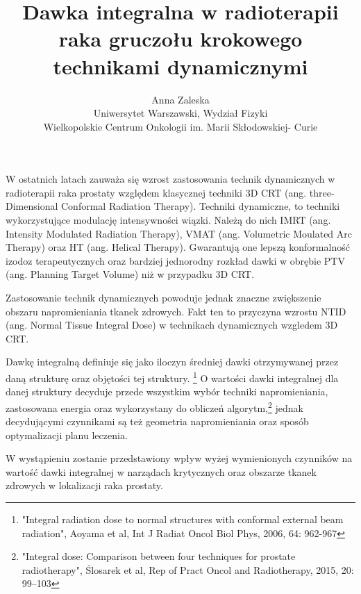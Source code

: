 \documentclass[12pt, a4paper]{article}
\begin{document}
\title{Dawka integralna w radioterapii raka gruczołu krokowego technikami dynamicznymi}
\author{Anna Zaleska \\ Uniwersytet Warszawski, Wydział Fizyki\\ Wielkopolskie Centrum Onkologii im. Marii Skłodowskiej- Curie}
\date {}
\maketitle
\thispagestyle{title}

W ostatnich latach zauważa się wzrost zastosowania technik dynamicznych w radioterapii raka prostaty względem klasycznej techniki 3D CRT (ang. three-Dimensional Conformal Radiation Therapy). Techniki dynamiczne, to techniki wykorzystujące modulację intensywności wiązki. Należą do nich IMRT (ang. Intensity Modulated Radiation Therapy), VMAT (ang. Volumetric Moulated Arc Therapy) oraz HT (ang. Helical Therapy). Gwarantują one lepszą konformalność izodoz terapeutycznych oraz bardziej jednorodny rozkład dawki w obrębie PTV (ang. Planning Target Volume) niż w przypadku 3D CRT.

Zastosowanie technik dynamicznych powoduje jednak znaczne zwiększenie obszaru napromieniania tkanek zdrowych. Fakt ten to przyczyna wzrostu NTID (ang. Normal Tissue Integral Dose) w technikach dynamicznych wzgledem 3D CRT. 

Dawkę integralną definiuje się jako iloczyn średniej dawki otrzymywanej przez daną strukturę oraz objętości tej struktury. \footnote{"Integral radiation dose to normal structures with conformal external beam radiation", Aoyama et al, Int J Radiat Oncol Biol Phys, 2006, 64: 962-967} O wartości dawki integralnej dla danej struktury decyduje przede wszystkim wybór techniki napromieniania, zastosowana energia oraz wykorzystany do obliczeń algorytm,\footnote{"Integral dose: Comparison between four techniques for prostate radiotherapy", Ślosarek et al, Rep of Pract Oncol and Radiotherapy, 2015, 20: 99–103} jednak decydującymi czynnikami są też geometria napromieniania oraz sposób optymalizacji planu leczenia. 

W wystąpieniu zostanie przedstawiony wpływ wyżej wymienionych czynników na wartość dawki integralnej w narządach krytycznych oraz obszarze tkanek zdrowych w lokalizacji raka prostaty.
\end{document}
